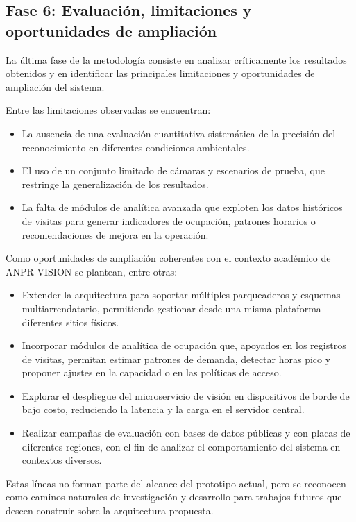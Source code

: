 \subsection{Fase 6: Evaluación, limitaciones y oportunidades de ampliación}

La última fase de la metodología consiste en analizar críticamente los resultados obtenidos y en identificar las principales limitaciones y oportunidades de ampliación del sistema.

Entre las limitaciones observadas se encuentran:

\begin{itemize}
    \item La ausencia de una evaluación cuantitativa sistemática de la precisión del reconocimiento en diferentes condiciones ambientales.
    \item El uso de un conjunto limitado de cámaras y escenarios de prueba, que restringe la generalización de los resultados.
    \item La falta de módulos de analítica avanzada que exploten los datos históricos de visitas para generar indicadores de ocupación, patrones horarios o recomendaciones de mejora en la operación.
\end{itemize}

Como oportunidades de ampliación coherentes con el contexto académico de ANPR-VISION se plantean, entre otras:

\begin{itemize}
    \item Extender la arquitectura para soportar múltiples parqueaderos y esquemas multiarrendatario, permitiendo gestionar desde una misma plataforma diferentes sitios físicos.
    \item Incorporar módulos de analítica de ocupación que, apoyados en los registros de visitas, permitan estimar patrones de demanda, detectar horas pico y proponer ajustes en la capacidad o en las políticas de acceso.
    \item Explorar el despliegue del microservicio de visión en dispositivos de borde de bajo costo, reduciendo la latencia y la carga en el servidor central.
    \item Realizar campañas de evaluación con bases de datos públicas y con placas de diferentes regiones, con el fin de analizar el comportamiento del sistema en contextos diversos.
\end{itemize}

Estas líneas no forman parte del alcance del prototipo actual, pero se reconocen como caminos naturales de investigación y desarrollo para trabajos futuros que deseen construir sobre la arquitectura propuesta.

